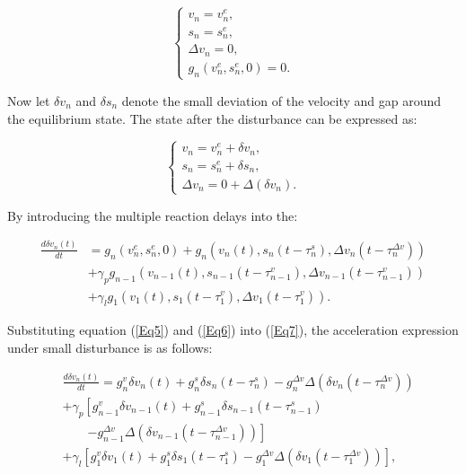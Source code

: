 \documentclass[journal]{IEEEtran}
\begin{document}
\begin{equation}
\left\{\begin{array}{l}
v_{n}=v_{n}^{e}, \\
s_{n}=s_{n}^{e}, \\
\Delta v_{n}=0, \\
g_{n}\left(v_{n}^{e}, s_{n}^{e}, 0\right)=0.
\end{array}\right.
\label{Eq5}
\end{equation}

Now let $\delta v_n$ and $\delta s_n$ denote the small deviation of the velocity and gap around the equilibrium state. The state after the disturbance can be expressed as:

\begin{equation}
\left\{\begin{array}{l}
v_{n}=v_{n}^{e}+\delta v_{n}, \\
s_{n}=s_{n}^{e}+\delta s_{n}, \\
\Delta v_{n}=0+\Delta\left(\delta v_{n}\right).
\end{array}\right.
\label{Eq6}
\end{equation}

By introducing the multiple reaction delays into the:

\begin{equation}
\begin{aligned}
\frac{d \delta v_{n}(t)}{d t}&=g_{n}\left(v_{n}^{e}, s_{n}^{e}, 0\right)+g_{n}\left(v_{n}(t), s_{n}\left(t-\tau_{n}^{s}\right), \Delta v_{n}\left(t-\tau_{n}^{\Delta v}\right)\right) \\
&+\gamma_{p} g_{n-1}\left(v_{n-1}(t), s_{n-1}\left(t-\tau_{n-1}^{v}\right), \Delta v_{n-1}\left(t-\tau_{n-1}^{v}\right)\right) \\
&+\gamma_{l} g_{1}\left(v_{1}(t), s_{1}\left(t-\tau_{1}^{v}\right), \Delta v_{1}\left(t-\tau_{1}^{v}\right)\right).
\end{aligned}
\label{Eq7}
\end{equation}

Substituting equation (\ref{Eq5}) and (\ref{Eq6}) into (\ref{Eq7}), the acceleration expression under small disturbance is as follows:

\begin{equation}
\begin{aligned}
&\frac{d \delta v_{n}(t)}{d t}=g_{n}^{v} \delta v_{n}(t)+g_{n}^{s} \delta s_{n}\left(t-\tau_{n}^{s}\right)-g_{n}^{\Delta v} \Delta\left(\delta v_{n}\left(t-\tau_{n}^{\Delta v}\right)\right) \\
&+\gamma_{p}\left[g_{n-1}^{v} \delta v_{n-1}(t)+g_{n-1}^{s} \delta s_{n-1}\left(t-\tau_{n-1}^{s}\right)\right. \\
&\quad\quad \left.-g_{n-1}^{\Delta v} \Delta\left(\delta v_{n-1}\left(t-\tau_{n-1}^{\Delta v}\right)\right)\right] \\
&+\gamma_{l}\left[g_{1}^{v} \delta v_{1}(t)+g_{1}^{s} \delta s_{1}\left(t-\tau_{1}^{s}\right)-g_{1}^{\Delta v} \Delta\left(\delta v_{1}\left(t-\tau_{1}^{\Delta v}\right)\right)\right],
\end{aligned}
\label{Eq8}
\end{equation}
\end{document}
